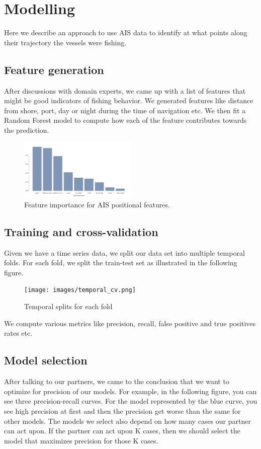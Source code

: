 \section{Modelling}

Here we describe an approach to use AIS data to identify at what points along their trajectory the vessels were fishing.

\subsection{Feature generation}

After discussions with domain experts, we came up with a list of features that might be good indicators of fishing behavior.
We generated features like distance from shore, port, day or night during the time of navigation etc. We then fit a Random Forest model to compute how each of the feature contributes towards the prediction.

\begin{figure}[H]
\centering
\includegraphics[width=0.5\textwidth]{images/feature_importance_final.png}
\caption{\label{fig:Feature importance}Feature importance for AIS positional features.}
\end{figure}

\subsection{Training and cross-validation}

Given we have a time series data, we split our data set into multiple temporal folds. For each fold, we split the train-test set as illustrated in the following figure.

\begin{figure}[H]
\centering
\texttt{[image: images/temporal\_cv.png]}
\caption{\label{fig:Temporal Cross-validation}Temporal splits for each fold}
\end{figure}

We compute various metrics like precision, recall, false positive and true positives rates etc.

\subsection{Model selection}
After talking to our partners, we came to the conclusion that we want to optimize for precision of our models.
For example, in the following figure, you can see three precision-recall curves. For the model represented by the blue curve, you see high precision at first and then the precision get worse than the same for other models. The models we select also depend on how many cases our partner can act upon. If the partner can act upon K cases, then we should select the model that maximizes precision for those K cases.

